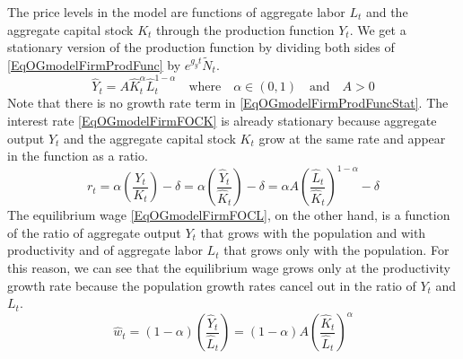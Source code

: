 \documentclass[letterpaper,12pt]{article}
\theoremstyle{definition}
\begin{document}
    The price levels in the model are functions of aggregate labor $L_t$ and the aggregate capital stock $K_t$ through the production function $Y_t$. We get a stationary version of the production function by dividing both sides of \eqref{EqOGmodelFirmProdFunc} by $e^{g_y t}\tilde{N}_t$.
    \begin{equation}\label{EqOGmodelFirmProdFuncStat}
      \hat{Y}_t =  A\hat{K}_t^\alpha \hat{L}_t^{1-\alpha}\quad\text{where}\quad \alpha\in(0,1) \quad\text{and}\quad A>0
    \end{equation}
    Note that there is no growth rate term in \eqref{EqOGmodelFirmProdFuncStat}. The interest rate \eqref{EqOGmodelFirmFOCK} is already stationary because aggregate output $Y_t$ and the aggregate capital stock $K_t$ grow at the same rate and appear in the function as a ratio.
    \begin{equation}\label{EqOGmodelFirmFOCKstat}
      r_t = \alpha\left(\frac{Y_t}{K_t}\right) - \delta = \alpha\left(\frac{\hat{Y}_t}{\hat{K}_t}\right) - \delta = \alpha A\left(\frac{\hat{L}_t}{\hat{K}_t}\right)^{1-\alpha} - \delta
    \end{equation}
    The equilibrium wage \eqref{EqOGmodelFirmFOCL}, on the other hand, is a function of the ratio of aggregate output $Y_t$ that grows with the population and with productivity and of aggregate labor $L_t$ that grows only with the population. For this reason, we can see that the equilibrium wage grows only at the productivity growth rate because the population growth rates cancel out in the ratio of $Y_t$ and $L_t$.
    \begin{equation}\label{EqOGmodelFirmFOCLstat}
      \hat{w}_t = (1-\alpha)\left(\frac{\hat{Y}_t}{\hat{L}_t}\right) = (1-\alpha)A\left(\frac{\hat{K}_t}{\hat{L}_t}\right)^\alpha
    \end{equation}
\end{document}
